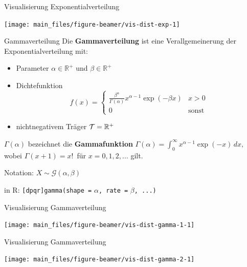 \documentclass[
  10pt,
  ignorenonframetext,
]{beamer}
\providecommand{\tightlist}{%
  \setlength{\itemsep}{0pt}\setlength{\parskip}{0pt}}
\begin{document}
\begin{frame}{Visualisierung Exponentialverteilung}
\label{visualisierung-exponentialverteilung}
\scriptsize

\begin{center}\texttt{[image: main\_files/figure-beamer/vis-dist-exp-1]} \end{center}

\normalsize
\end{frame}

\begin{frame}[fragile]{Gammaverteilung}
\label{gammaverteilung}
Die \textbf{Gammaverteilung} ist eine Verallgemeinerung der
Exponentialverteilung mit:

\begin{itemize}
\tightlist
\item
  Parameter \(\alpha \in \mathbb{R}^+\) und \(\beta \in \mathbb{R}^+\)
\item
  Dichtefunktion \[
  f(x) = \begin{cases}
  \frac{\beta^\alpha}{\Gamma (\alpha)} x^{\alpha - 1} \exp (-\beta x) &  x > 0  \\
  0 & \text{sonst}
  \end{cases}
  \]
\item
  nichtnegativem Träger \({\cal T} = \mathbb{R}^+\) ~
\end{itemize}

\(\Gamma(\alpha)\) bezeichnet die \textbf{Gammafunktion}
\(\Gamma(\alpha) = \int_0^\infty x^{\alpha - 1} \exp(-x)\,dx,\) wobei
\(\Gamma(x+1)=x!\,\) für \(x=0,1,2,...\) gilt.

Notation: \(X \sim \mathcal{G}(\alpha, \beta)\)

in R: \texttt{{[}dpqr{]}gamma(shape\ =} \(\alpha\)\texttt{,\ rate\ =}
\(\beta\)\texttt{,\ ...)}
\end{frame}

\begin{frame}{Visualisierung Gammaverteilung}
\label{visualisierung-gammaverteilung}
\scriptsize

\begin{center}\texttt{[image: main\_files/figure-beamer/vis-dist-gamma-1-1]} \end{center}

\normalsize
\end{frame}

\begin{frame}{Visualisierung Gammaverteilung}
\label{visualisierung-gammaverteilung-1}
\scriptsize

\begin{center}\texttt{[image: main\_files/figure-beamer/vis-dist-gamma-2-1]} \end{center}

\normalsize
\end{frame}
\end{document}
